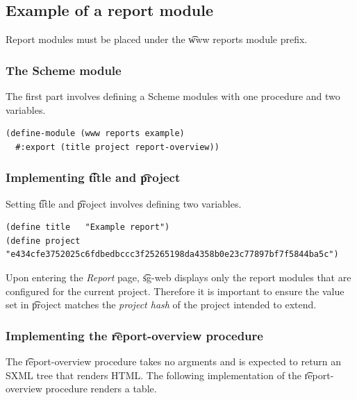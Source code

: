 \subsection{Example of a report module}

  Report modules must be placed under the \t{www reports} module prefix.

\subsubsection{The Scheme module}
\label{sec:scheme-module}

  The first part involves defining a Scheme modules with one procedure and
  two variables.

\begin{siderules}
\begin{verbatim}
(define-module (www reports example)
  #:export (title project report-overview))
\end{verbatim}
\end{siderules}

\subsubsection{Implementing \t{title} and \t{project}}

  Setting \t{title} and \t{project} involves defining two variables.

\begin{siderules}
\begin{verbatim}
(define title   "Example report")
(define project "e434cfe3752025c6fdbedbccc3f25265198da4358b0e23c77897bf7f5844ba5c")
\end{verbatim}
\end{siderules}

  Upon entering the \emph{Report} page, \t{sg-web} displays only the report
  modules that are configured for the current project.  Therefore it is
  important to ensure the value set in \t{project} matches the
  \emph{project hash} of the project intended to extend.

\subsubsection{Implementing the \t{report-overview} procedure}

  The \t{report-overview} procedure takes no argments and is expected to
  return an SXML tree that renders HTML.  The following implementation of
  the \t{report-overview} procedure renders a table.

